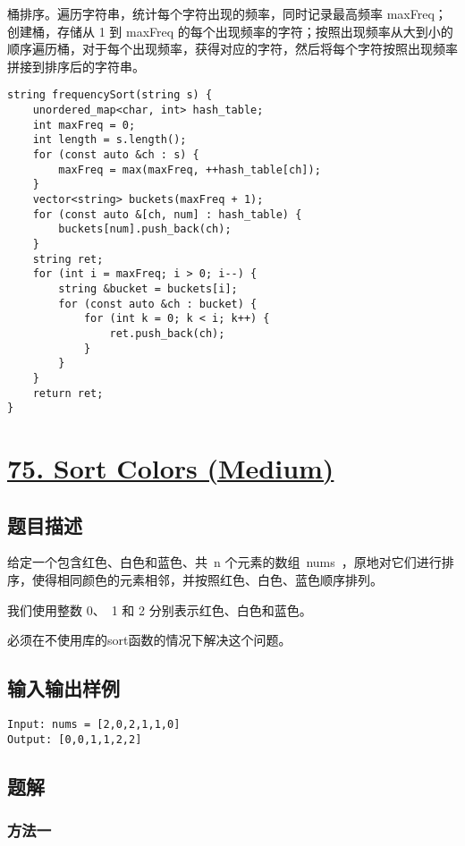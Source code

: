\documentclass[lang=cn,10pt]{elegantbook}
\begin{document}
桶排序。遍历字符串，统计每个字符出现的频率，同时记录最高频率 maxFreq；创建桶，存储从 1 到 maxFreq 的每个出现频率的字符；按照出现频率从大到小的顺序遍历桶，对于每个出现频率，获得对应的字符，然后将每个字符按照出现频率拼接到排序后的字符串。

\begin{lstlisting}
string frequencySort(string s) {
	unordered_map<char, int> hash_table;
	int maxFreq = 0;
	int length = s.length();
	for (const auto &ch : s) {
		maxFreq = max(maxFreq, ++hash_table[ch]);
	}
	vector<string> buckets(maxFreq + 1);
	for (const auto &[ch, num] : hash_table) {
		buckets[num].push_back(ch);
	}
	string ret;
	for (int i = maxFreq; i > 0; i--) {
		string &bucket = buckets[i];
		for (const auto &ch : bucket) {
			for (int k = 0; k < i; k++) {
				ret.push_back(ch);
			}
		}
	}
	return ret;
}
\end{lstlisting}

{\color{red}\section{\href{https://leetcode.cn/problems/sort-colors/}{75. Sort Colors (Medium)}}} \label{ch5.75}

\subsection*{题目描述}

给定一个包含红色、白色和蓝色、共 n 个元素的数组 nums ，原地对它们进行排序，使得相同颜色的元素相邻，并按照红色、白色、蓝色顺序排列。

我们使用整数 0、 1 和 2 分别表示红色、白色和蓝色。

必须在不使用库的sort函数的情况下解决这个问题。

\subsection*{输入输出样例}

\begin{lstlisting}
Input: nums = [2,0,2,1,1,0]
Output: [0,0,1,1,2,2]
\end{lstlisting}

\subsection*{题解}

\subsubsection*{方法一}
\end{document}
